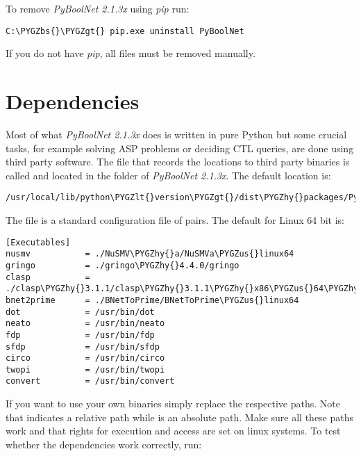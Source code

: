 \documentclass[letterpaper,10pt,english]{sphinxmanual}
\def\PYGZbs{\char`\\}
\def\PYGZus{\char`\_}
\def\PYGZlt{\char`\<}
\def\PYGZgt{\char`\>}
\def\PYGZhy{\char`\-}
\begin{document}
To remove \emph{PyBoolNet 2.1.3x} using \emph{pip} run:

\begin{Verbatim}[commandchars=\\\{\}]
C:\PYGZbs{}\PYGZgt{} pip.exe uninstall PyBoolNet
\end{Verbatim}

If you do not have \emph{pip}, all files must be removed manually.


\section{Dependencies}
\label{Installation:dependencies}
Most of what \emph{PyBoolNet 2.1.3x} does is written in pure Python but some crucial tasks, for example solving ASP problems or deciding CTL queries, are done using third party software.
The file that records the locations to third party binaries is called  and located in the folder  of \emph{PyBoolNet 2.1.3x}.
The default location is:

\begin{Verbatim}[commandchars=\\\{\}]
/usr/local/lib/python\PYGZlt{}version\PYGZgt{}/dist\PYGZhy{}packages/PyBoolNet/Dependencies/settings.cfg
\end{Verbatim}

The file is a standard configuration file of  pairs. The default for Linux 64 bit is:

\begin{Verbatim}[commandchars=\\\{\}]
[Executables]
nusmv           = ./NuSMV\PYGZhy{}a/NuSMVa\PYGZus{}linux64
gringo          = ./gringo\PYGZhy{}4.4.0/gringo
clasp           = ./clasp\PYGZhy{}3.1.1/clasp\PYGZhy{}3.1.1\PYGZhy{}x86\PYGZus{}64\PYGZhy{}linux
bnet2prime      = ./BNetToPrime/BNetToPrime\PYGZus{}linux64
dot             = /usr/bin/dot
neato           = /usr/bin/neato
fdp             = /usr/bin/fdp
sfdp            = /usr/bin/sfdp
circo           = /usr/bin/circo
twopi           = /usr/bin/twopi
convert         = /usr/bin/convert
\end{Verbatim}

If you want to use your own binaries simply replace the respective paths. Note that  indicates a relative path while \code{/} is an absolute path.
Make sure all these paths work and that rights for execution and access are set on linux systems.
To test whether the dependencies work correctly, run:
\end{document}
